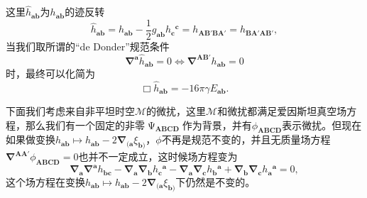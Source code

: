 这里$\hat{h}_{\boldsymbol{ab}}$为$h_{\boldsymbol{ab}}$的迹反转
\begin{equation*}
	\hat{h}_{\boldsymbol{ab}} =h_{\boldsymbol{ab}} -\frac{1}{2} g_{\boldsymbol{ab}} h{_{\boldsymbol{c}}}^{\boldsymbol{c}} =h_{\boldsymbol{AB} '\boldsymbol{BA} '} =h_{\boldsymbol{BA} '\boldsymbol{AB} '} ,
\end{equation*}
当我们取所谓的“de Donder”规范条件
\begin{equation*}
	\mathbf{\nabla }^{\boldsymbol{a}}\hat{h}_{\boldsymbol{ab}} =0\Leftrightarrow \mathbf{\nabla }^{\boldsymbol{AB} '} h_{\boldsymbol{ab}} =0
\end{equation*}
时，最终可以化简为
\begin{equation*}
	\Box \hat{h}_{\boldsymbol{ab}} =-16\pi \gamma E_{\boldsymbol{ab}} .
\end{equation*}


下面我们考虑来自非平坦时空$\mathcal{M}$的微扰，这里$\mathcal{M}$和微扰都满足爱因斯坦真空场方程，那么我们有一个固定的非零$\upPsi _{\boldsymbol{ABCD}}$作为背景，并有$\phi _{\boldsymbol{ABCD}}$表示微扰。但现在如果做变换$h_{\boldsymbol{ab}} \mapsto h_{\boldsymbol{ab}} -2\mathbf{\nabla }_{(\boldsymbol{a}} \xi _{\boldsymbol{b})}$，$\phi $不再是规范不变的，并且无质量场方程$\mathbf{\nabla }^{\boldsymbol{AA} '} \phi _{\boldsymbol{ABCD}} =0$也并不一定成立，这时候场方程变为
\begin{equation}
	\mathbf{\nabla }_{\boldsymbol{a}}\mathbf{\nabla }^{\boldsymbol{a}} h_{\boldsymbol{bc}} -\mathbf{\nabla }_{\boldsymbol{a}}\mathbf{\nabla }_{\boldsymbol{b}} h{_{\boldsymbol{c}}}^{\boldsymbol{a}} -\mathbf{\nabla }_{\boldsymbol{a}}\mathbf{\nabla }_{\boldsymbol{c}} h{_{\boldsymbol{b}}}^{\boldsymbol{a}} +\mathbf{\nabla }_{\boldsymbol{b}}\mathbf{\nabla }_{\boldsymbol{c}} h{_{\boldsymbol{a}}}^{\boldsymbol{a}} =0,
	\label{eq:6.44}
\end{equation}
这个场方程在变换$h_{\boldsymbol{ab}} \mapsto h_{\boldsymbol{ab}} -2\mathbf{\nabla }_{(\boldsymbol{a}} \xi _{\boldsymbol{b})}$下仍然是不变的。

